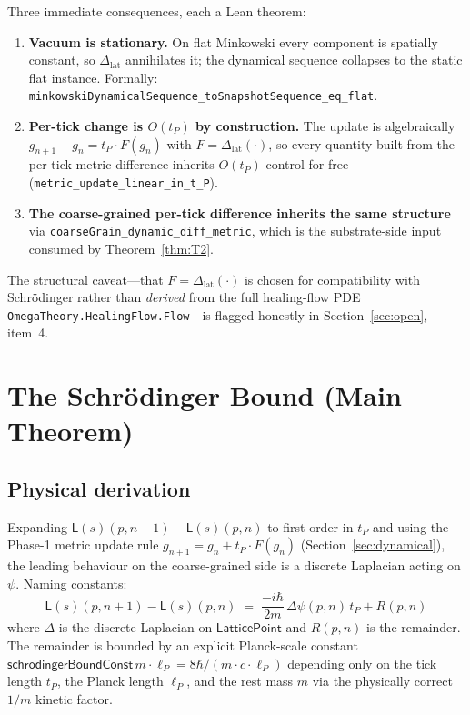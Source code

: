 \documentclass[11pt,a4paper,twoside]{article}
\theoremstyle{definition}
\newcommand{\lP}{\ell_P}
\newcommand{\tP}{t_P}
\newcommand{\Lmap}{\mathsf{L}}
\newcommand{\code}[1]{\texttt{#1}}
\begin{document}
Three immediate consequences, each a Lean theorem:
\begin{enumerate}
\item \textbf{Vacuum is stationary.} On flat Minkowski every component
  is spatially constant, so $\Delta_{\mathrm{lat}}$ annihilates it; the
  dynamical sequence collapses to the static flat instance. Formally:
  \code{minkowskiDynamicalSequence\_toSnapshotSequence\_eq\_flat}.
\item \textbf{Per-tick change is $O(\tP)$ by construction.} The update
  is algebraically $g_{n+1}-g_{n}=\tP\cdot F(g_{n})$ with
  $F=\Delta_{\mathrm{lat}}(\cdot)$, so every quantity built from the
  per-tick metric difference inherits $O(\tP)$ control for free
  (\code{metric\_update\_linear\_in\_t\_P}).
\item \textbf{The coarse-grained per-tick difference inherits the same
  structure} via \code{coarseGrain\_dynamic\_diff\_metric}, which is
  the substrate-side input consumed by Theorem~\ref{thm:T2}.
\end{enumerate}

The structural caveat---that $F=\Delta_{\mathrm{lat}}(\cdot)$ is chosen
for compatibility with Schr\"odinger rather than \emph{derived} from
the full healing-flow PDE \code{OmegaTheory.HealingFlow.Flow}---is
flagged honestly in Section~\ref{sec:open}, item~4.

\section{The Schr\"odinger Bound (Main Theorem)}\label{sec:schrodinger}

\subsection{Physical derivation}\label{sec:schrodinger-physical}

Expanding $\Lmap(s)(p,n+1)-\Lmap(s)(p,n)$ to first order in $\tP$ and
using the Phase-1 metric update rule $g_{n+1}=g_{n}+\tP\cdot F(g_{n})$
(Section~\ref{sec:dynamical}), the leading behaviour on the
coarse-grained side is a discrete Laplacian acting on $\psi$. Naming
constants:
\[
\Lmap(s)(p,n+1)-\Lmap(s)(p,n)
 \;=\; \frac{-i\hbar}{2m}\,\Delta\psi(p,n)\,\tP + R(p,n)
\]
where $\Delta$ is the discrete Laplacian on $\mathsf{LatticePoint}$
and $R(p,n)$ is the remainder. The remainder is bounded by an explicit
Planck-scale constant
$\mathsf{schrodingerBoundConst}\,m\cdot\lP=8\hbar/(m\cdot c\cdot\lP)$
depending only on the tick length $\tP$, the Planck length $\lP$, and
the rest mass $m$ via the physically correct $1/m$ kinetic factor.
\end{document}

